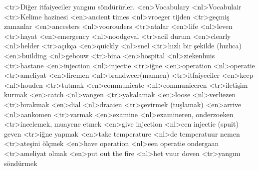 <tr>Diğer itfaiyeciler yangını söndürürler.
<en>Vocabulary
<nl>Vocabulair
<tr>Kelime hazinesi
<en>ancient times
<nl>vroeger tijden
<tr>geçmiş zamanlar
<en>ancesters
<nl>voorouders
<tr>atalar
<en>life
<nl>leven
<tr>hayat
<en>emergency
<nl>noodgeval
<tr>acil durum
<en>clearly
<nl>helder
<tr>açıkça
<en>quickly
<nl>snel
<tr>hızlı bir şekilde (hızlıca)
<en>building
<nl>gebouw
<tr>bina
<en>hospital
<nl>ziekenhuis
<tr>hastane
<en>injection
<nl>injectie
<tr>iğne
<en>operation
<nl>operatie
<tr>ameliyat
<en>firemen
<nl>brandweer(mannen)
<tr>itfaiyeciler
<en>keep
<nl>houden
<tr>tutmak
<en>communicate
<nl>communiceren
<tr>iletişim kurmak
<en>catch
<nl>vangen
<tr>yakalamak
<en>loose
<nl>verliezen
<tr>bırakmak
<en>dial
<nl>draaien
<tr>çevirmek (tuşlamak)
<en>arrive
<nl>aankomen
<tr>varmak
<en>examine
<nl>examineren, onderzoeken
<tr>incelemek, muayene etmek
<en>give injection
<nl>een injectie (spuit) geven
<tr>iğne yapmak
<en>take  temperature
<nl>de temperatuur nemen
<tr>ateşini ölçmek
<en>have operation
<nl>een operatie ondergaan
<tr>ameliyat olmak
<en>put out the fire
<nl>het vuur doven
<tr>yangını söndürmek
